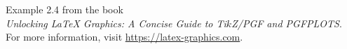 \documentclass{article}
\begin{document}
Example 2.4 from the book\\
\emph{Unlocking LaTeX Graphics: A Concise Guide to Ti$k$Z/PGF and PGFPLOTS}.\\
For more information, visit \url{https://latex-graphics.com}.
\par\bigskip

\end{document}
